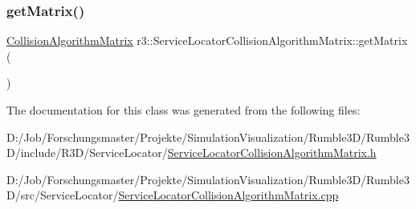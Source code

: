 \subsubsection{\texorpdfstring{get\+Matrix()}{getMatrix()}}
{\footnotesize\ttfamily \mbox{\hyperlink{classr3_1_1_collision_algorithm_matrix}{Collision\+Algorithm\+Matrix}} r3\+::\+Service\+Locator\+Collision\+Algorithm\+Matrix\+::get\+Matrix (\begin{DoxyParamCaption}{ }\end{DoxyParamCaption})\hspace{0.3cm}{\ttfamily [static]}}



The documentation for this class was generated from the following files\+:\begin{DoxyCompactItemize}
\item 
D\+:/\+Job/\+Forschungsmaster/\+Projekte/\+Simulation\+Visualization/\+Rumble3\+D/\+Rumble3\+D/include/\+R3\+D/\+Service\+Locator/\mbox{\hyperlink{_service_locator_collision_algorithm_matrix_8h}{Service\+Locator\+Collision\+Algorithm\+Matrix.\+h}}\item 
D\+:/\+Job/\+Forschungsmaster/\+Projekte/\+Simulation\+Visualization/\+Rumble3\+D/\+Rumble3\+D/src/\+Service\+Locator/\mbox{\hyperlink{_service_locator_collision_algorithm_matrix_8cpp}{Service\+Locator\+Collision\+Algorithm\+Matrix.\+cpp}}\end{DoxyCompactItemize}
